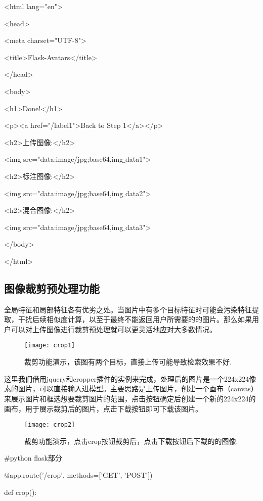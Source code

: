 \documentclass[bachelor_p]{hdu-thesis}
\begin{document}
<html lang="en">

<head>

<meta charset="UTF-8">

<title>Flask-Avatars</title>

</head>

<body>

<h1>Done!</h1>

<p><a href="/label1">Back to Step 1</a></p>

<h2>上传图像:</h2>

<img src="data:image/jpg;base64,{{img$\_$data1}}">

<h2>标注图像:</h2>

<img src="data:image/jpg;base64,{{img$\_$data2}}">

<h2>混合图像:</h2>

<img src="data:image/jpg;base64,{{img$\_$data3}}">

</body>

</html>

\subsection {图像裁剪预处理功能}

全局特征和局部特征各有优劣之处。当图片中有多个目标特征时可能会污染特征提取，干扰后续相似度计算，以至于最终不能返回用户所需要的的图片。那么如果用户可以对上传图像进行裁剪预处理就可以更灵活地应对大多数情况。

\begin{figure}[!htb]
  \centering
  \texttt{[image: crop1]}
  \caption{裁剪功能演示，该图有两个目标，直接上传可能导致检索效果不好.}
  \label{fig_crop1}
\end{figure}

这里我们借用jquery和cropper插件的实例来完成，处理后的图片是一个224x224像素的图片，可以直接输入进模型。主要思路是上传图片，创建一个画布（canvas）来展示图片和框选想要裁剪图片的范围，点击按钮确定后创建一个新的224x224的画布，用于展示裁剪后的图片，点击下载按钮即可下载该图片。

\begin{figure}[!htb]
  \centering
  \texttt{[image: crop2]}
  \caption{裁剪功能演示，点击crop按钮裁剪后，点击下载按钮后下载的的图像.}
  \label{fig_crop2}
\end{figure}

$\#$python flask部分

@app.route('/crop', methods=['GET', 'POST'])

def crop():
\end{document}
